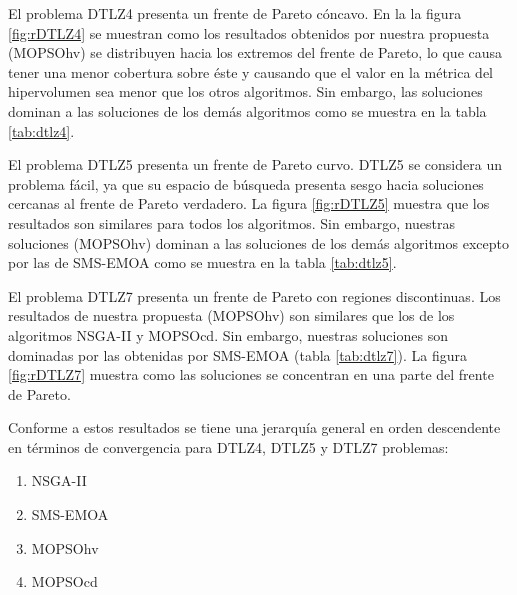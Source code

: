 El problema DTLZ4 presenta un frente de Pareto c\'oncavo. En la la figura \ref{fig:rDTLZ4} se muestran como los 
resultados obtenidos por nuestra propuesta (MOPSOhv) se distribuyen hacia los extremos del frente de Pareto, lo que causa tener una menor 
cobertura sobre \'este y causando que el valor en 
la m\'etrica del hipervolumen sea menor que los otros algoritmos. Sin embargo, las soluciones dominan a las soluciones de los 
dem\'as algoritmos como se muestra en la tabla \ref{tab:dtlz4}.

El problema DTLZ5 presenta un frente de Pareto curvo. DTLZ5 se considera un problema f\'acil, ya que su espacio de b\'usqueda 
presenta sesgo hacia soluciones cercanas al frente de Pareto verdadero. La figura \ref{fig:rDTLZ5} muestra que los resultados son similares 
para todos los algoritmos. Sin embargo, nuestras soluciones (MOPSOhv) dominan a las soluciones de los dem\'as algoritmos
excepto por las de SMS-EMOA como se muestra en la tabla \ref{tab:dtlz5}.

El problema DTLZ7 presenta un frente de Pareto con regiones discontinuas. Los resultados de nuestra propuesta (MOPSOhv) son similares que los de 
los algoritmos NSGA-II y MOPSOcd. Sin embargo, nuestras soluciones son dominadas por las obtenidas por SMS-EMOA
(tabla \ref{tab:dtlz7}). La figura \ref{fig:rDTLZ7} muestra como las soluciones se concentran en una parte del frente de Pareto.

 Conforme a estos resultados se tiene una jerarqu\'ia general en orden descendente en t\'erminos de convergencia para  
 DTLZ4, DTLZ5 y DTLZ7 problemas:

\begin{enumerate}
  \item  NSGA-II
  \item SMS-EMOA
  \item MOPSOhv
  \item MOPSOcd
\end{enumerate}

